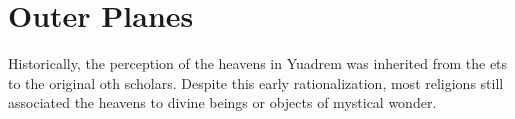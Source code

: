 
\section{Outer Planes}
Historically, the perception of the heavens in Yuadrem was inherited from the ets to the original oth scholars.
Despite this early rationalization, most religions still associated the heavens to divine beings or objects of mystical wonder.




